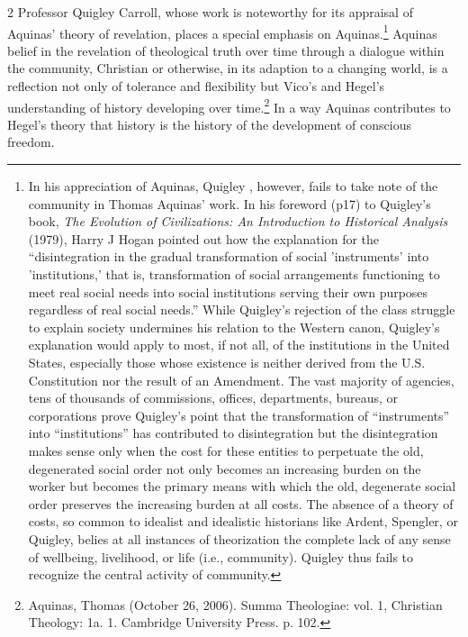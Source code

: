 \documentclass[10pt,a4paper,twoside]{article} %
\begin{document}
\begin{multicols}{2}
{\newline \indent Professor Quigley Carroll, whose work is noteworthy for its appraisal of Aquinas' theory of revelation, places a special emphasis on Aquinas.\footnote{ In his appreciation of Aquinas, Quigley , however, fails to take note of the community in Thomas Aquinas' work. In his foreword (p17) to Quigley’s book, \emph{The Evolution of Civilizations: An Introduction to Historical Analysis} (1979), Harry J Hogan pointed out how  the explanation for the “disintegration in the gradual transformation of social 'instruments' into 'institutions,' that is, transformation of social arrangements functioning to meet real social needs into social institutions serving their own purposes regardless of real social needs.” While Quigley’s rejection of the class struggle to explain society undermines his relation to the Western canon, Quigley’s explanation would apply to most, if not all, of the institutions in the United States, especially those whose existence is neither derived from the U.S. Constitution nor the result of an Amendment. The vast majority of agencies, tens of thousands of commissions, offices, departments, bureaus, or corporations prove Quigley’s point that the transformation of “instruments” into “institutions” has contributed to disintegration but the disintegration makes sense only when the cost for these entities to perpetuate the old, degenerated social order not only becomes an increasing burden on the worker but becomes the primary means with which the old, degenerate social order preserves the increasing burden at all costs. The absence of a theory of costs, so common to idealist and idealistic historians like Ardent, Spengler, or Quigley, belies at all instances of theorization the complete lack of any sense of wellbeing, livelihood, or life (i.e., community). Quigley thus fails to recognize the central activity of community.} Aquinas belief in the revelation of theological truth over time through a dialogue within the community, Christian or otherwise, in its adaption to a changing world, is a reflection not only of tolerance and flexibility but Vico's and Hegel's understanding of history developing over time.\footnote{Aquinas, Thomas (October 26, 2006). Summa Theologiae: vol. 1, Christian Theology: 1a. 1. Cambridge University Press. p. 102.} In a way Aquinas contributes to Hegel's theory that history is the history of the development of conscious freedom. 
}



\end{multicols}
\end{document}
